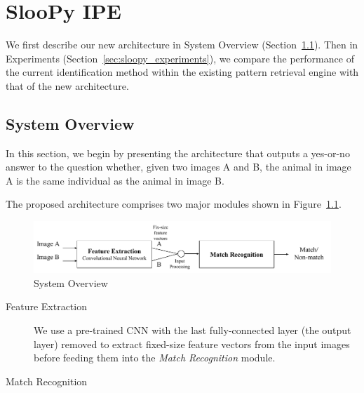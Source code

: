 \graphicspath{{images/chap7/}}
\chapter{SlooPy IPE} %
\label{cha:sloopy_ipe}

We first describe our new architecture in System Overview
(Section~\ref{sec:system_overview}). Then in Experiments
(Section~\ref{sec:sloopy_experiments}), we compare the performance of the current
identification method within the existing pattern retrieval engine with that of
the new architecture.

\section{System Overview} %
\label{sec:system_overview}

In this section, we begin by presenting the architecture that outputs a
yes-or-no answer to the question whether, given two images A and B, the animal
in image A is the same individual as the animal in image B.

The proposed architecture comprises two major modules shown in
Figure~\ref{fig:cnn_overview}.

\begin{figure}[htb]
  \centering
  \includegraphics[width=\textwidth]{system/overview}
  \caption{System Overview}
  \label{fig:cnn_overview} %
\end{figure}

\begin{description}
    \item[Feature Extraction] We use a pre-trained CNN with the last
        fully-connected layer (the output layer) removed to extract fixed-size feature
  vectors from the input images before feeding them into the \emph{Match
  Recognition} module.
  \item[Match Recognition]
\end{description}

